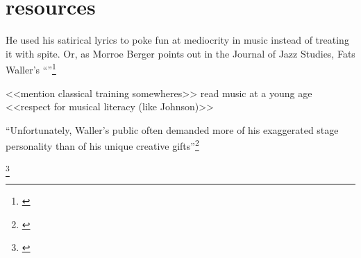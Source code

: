 \documentclass[11pt]{report}
\begin{document}
	\section{resources}

	He used his satirical lyrics to poke fun at mediocrity in music instead of treating it with spite. Or, as Morroe Berger points out in the Journal of Jazz Studies, Fats Waller's ``''\footnote{\cite[4]{outside-insider}}

	<<mention classical training somewheres>>
	read music at a young age
	<<respect for musical literacy (like Johnson)>>\cite{life}


	``Unfortunately, Waller's public often demanded more of his exaggerated stage personality than of his unique creative gifts''\footnote{\cite[40]{grove-book:waller}}


	\footnote{\cite{youtube-joint_is_jumpin}}


\end{document}
